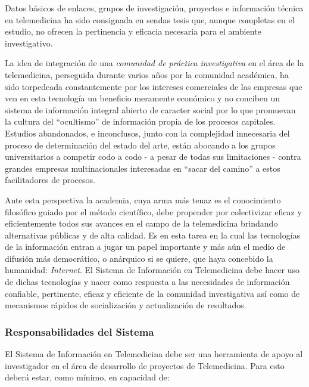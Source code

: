 Datos básicos de enlaces, grupos de investigación, proyectos e información técnica en telemedicina ha sido consignada en sendas tesis que, aunque completas en el estudio, no ofrecen la pertinencia y eficacia necesaria para el ambiente investigativo. 

La idea de integración de una \textit{comunidad de práctica investigativa} en el área de la telemedicina, perseguida durante varios años por la comunidad académica, ha sido torpedeada constantemente por los intereses comerciales de las empresas que ven en esta tecnología un beneficio meramente económico y no conciben un sistema de información integral abierto de caracter social por lo que promuevan la cultura del “ocultismo” de información propia de los procesos capitales. Estudios abandonados, e inconclusos, junto con la complejidad innecesaria del proceso de determinación del estado del arte, están abocando a los grupos universitarios a competir codo a codo - a pesar de todas sus limitaciones - contra grandes empresas multinacionales interesadas en “sacar del camino” a estos facilitadores de procesos.

Ante esta perspectiva la academia, cuya arma más tenaz es el conocimiento filosófico guiado por el método científico, debe propender por colectivizar eficaz y eficientemente todos sus avances en el campo de la telemedicina brindando alternativas públicas y de alta calidad. Es en esta tarea en la cual las tecnologías de la información entran a jugar un papel importante y más aún el medio de difusión más democrático, o anárquico si se quiere, que haya concebido la humanidad: \textit{Internet}. El Sistema de Información en Telemedicina debe hacer uso de dichas tecnologías y nacer como respuesta a las necesidades de información confiable, pertinente, eficaz y eficiente de la comunidad investigativa así como de mecanismos rápidos de socialización y actualización de resultados.

\subsubsection{Responsabilidades del Sistema}
El Sistema de Información en Telemedicina debe ser una herramienta de apoyo al investigador en el área de desarrollo de proyectos de Telemedicina. Para esto deberá estar, como mínimo, en capacidad de:

